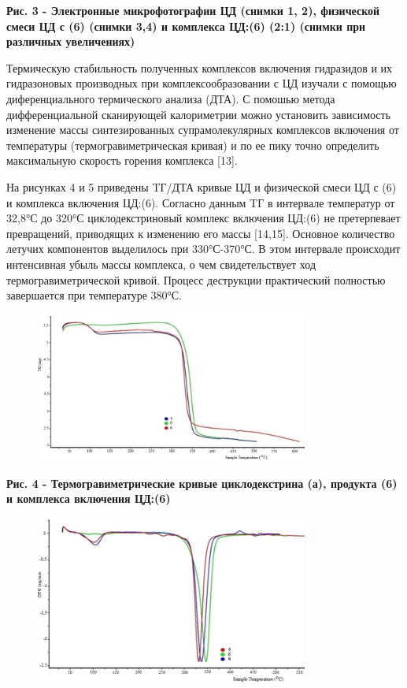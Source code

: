 {\bfseries Рис. 3 - Электронные микрофотографии ЦД (снимки 1, 2),
физической смеси ЦД с (6) (снимки 3,4) и комплекса ЦД:(6) (2:1) (снимки
при различных увеличениях)}

Термическую стабильность полученных комплексов включения гидразидов и их
гидразоновых производных при комплексообразовании с ЦД изучали с помощью
диференциального термического анализа (ДТА). С помошью метода
дифференциальной сканирующей калориметрии можно установить зависимость
изменение массы синтезированных супрамолекулярных комплексов включения
от температуры (термогравиметрическая кривая) и по ее пику точно
определить максимальную скорость горения комплекса {[}13{]}.

На рисунках 4 и 5 приведены TГ/ДТА кривые ЦД и физической смеси ЦД с (6)
и комплекса включения ЦД:(6). Согласно данным TГ в интервале температур
от 32,8°С до 320°С циклодекстриновый комплекс включения ЦД:(6) не
претерпевает превращений, приводящих к изменению его массы {[}14,15{]}.
Основное количество летучих компонентов выделилось при 330°С-370°С. В
этом интервале происходит интенсивная убыль массы комплекса, о чем
свидетельствует ход термогравиметрической кривой. Процесс деструкции
практический полностью завершается при температуре 380°С.

\begin{figure}[H]
	\centering
	\includegraphics[width=0.8\textwidth]{assets/51}
	\caption*{}
\end{figure}

{\bfseries Рис. 4 - Термогравиметрические кривые циклодекстрина (а),
продукта (6) и комплекса включения ЦД:(6)}

\begin{figure}[H]
	\centering
	\includegraphics[width=0.8\textwidth]{assets/52}
	\caption*{}
\end{figure}

